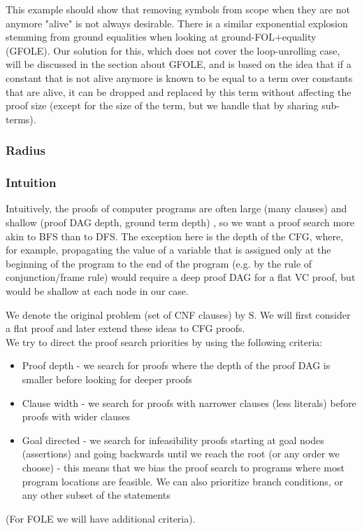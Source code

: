 This example should show that removing symbols from scope when they are not anymore "alive" is not always desirable. 
There is a similar exponential explosion stemming from ground equalities when looking at ground-FOL+equality (GFOLE). 
Our solution for this, which does not cover the loop-unrolling case, will be discussed in the section about GFOLE, and is based on the idea that if a constant that is not alive anymore is known to be equal to a term over constants that are alive, it can be dropped and replaced by this term without affecting the proof size (except for the size of the term, but we handle that by sharing sub-terms).

\newpage
\subsubsection{Radius}

\subsubsection*{Intuition}
Intuitively, the proofs of computer programs are often large (many clauses) and shallow (proof DAG depth, ground term depth) \cite{}, so we want a proof search more akin to BFS than to DFS. The exception here is the depth of the CFG, where, for example, propagating the value of a variable that is assigned only at the beginning of the program to the end of the program (e.g. by the rule of conjunction/frame rule) would require a deep proof DAG for a flat VC proof, but would be shallow at each node in our case.

We denote the original problem (set of CNF clauses) by $\mathrm{S}$. We will first consider a flat proof and later extend these ideas to CFG proofs.\\
We try to direct the proof search priorities by using the following criteria:
\begin{itemize}
	\item Proof depth - we search for proofs where the depth of the proof DAG is smaller before looking for deeper proofs
	\item Clause width - we search for proofs with narrower clauses (less literals) before proofs with wider clauses
	\item Goal directed - we search for infeasibility proofs starting at goal nodes (assertions) and going backwards until we reach the root (or any order we choose) - this means that we bias the proof search to programs where most program locations are feasible. We can also prioritize branch conditions, or any other subset of the statements
\end{itemize}
(For FOLE we will have additional criteria).

